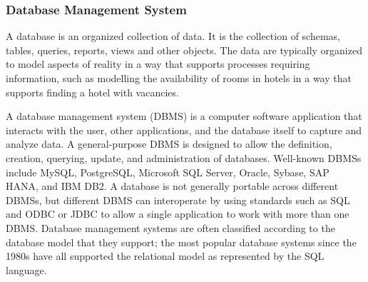 \documentclass[conference]{IEEEtran}
\begin{document}
\subsubsection{Database Management System}

A database is an organized collection of data. It is the collection of schemas, tables, queries, reports, views and other objects. The data are typically organized to model aspects of reality in a way that supports processes requiring information, such as modelling the availability of rooms in hotels in a way that supports finding a hotel with vacancies.

A database management system (DBMS) is a computer software application that interacts with the user, other applications, and the database itself to capture and analyze data. A general-purpose DBMS is designed to allow the definition, creation, querying, update, and administration of databases. Well-known DBMSs include MySQL, PostgreSQL, Microsoft SQL Server, Oracle, Sybase, SAP HANA, and IBM DB2. A database is not generally portable across different DBMSs, but different DBMS can interoperate by using standards such as SQL and ODBC or JDBC to allow a single application to work with more than one DBMS. Database management systems are often classified according to the database model that they support; the most popular database systems since the 1980s have all supported the relational model as represented by the SQL language.
\end{document}
